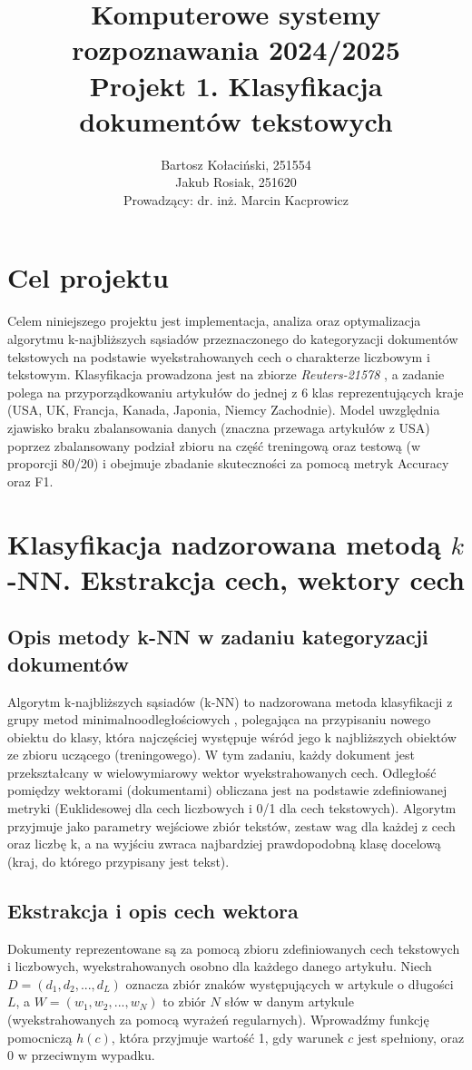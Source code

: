\documentclass{article}
\author{
	{Bartosz Kołaciński, 251554}\\
	{Jakub Rosiak, 251620}\\ 
	{Prowadzący: dr. inż. Marcin Kacprowicz}
}
\title{Komputerowe systemy rozpoznawania 2024/2025\\Projekt 1. Klasyfikacja dokumentów tekstowych}
\begin{document}
	\maketitle
	
	\section{Cel projektu}	
	Celem niniejszego projektu jest implementacja, analiza oraz optymalizacja algorytmu k-najbliższych sąsiadów  przeznaczonego do kategoryzacji dokumentów tekstowych na podstawie wyekstrahowanych cech o charakterze liczbowym i tekstowym.
	Klasyfikacja prowadzona jest na zbiorze \textit{Reuters-21578} \cite{reuters21578}, a zadanie polega na przyporządkowaniu artykułów do jednej z 6 klas reprezentujących kraje (USA, UK, Francja, Kanada, Japonia, Niemcy Zachodnie).
	Model uwzględnia zjawisko braku zbalansowania danych (znaczna przewaga artykułów z USA) poprzez zbalansowany podział zbioru na część treningową oraz testową (w proporcji 80/20) i obejmuje zbadanie skuteczności za pomocą metryk Accuracy oraz F1.
	
	\section{Klasyfikacja nadzorowana metodą $k$-NN.  Ekstrakcja cech, wektory cech}
	
	\subsection{Opis metody k-NN w zadaniu kategoryzacji dokumentów}
	Algorytm k-najbliższych sąsiadów (k-NN) to nadzorowana metoda klasyfikacji z grupy metod minimalnoodległościowych \cite{tadeusiewicz90}, polegająca na przypisaniu nowego obiektu do klasy, która najczęściej występuje wśród jego k najbliższych obiektów ze zbioru uczącego (treningowego). W tym zadaniu, każdy dokument jest przekształcany w wielowymiarowy wektor wyekstrahowanych cech.
	Odległość pomiędzy wektorami (dokumentami) obliczana jest na podstawie zdefiniowanej metryki (Euklidesowej dla cech liczbowych i 0/1 dla cech tekstowych). Algorytm przyjmuje jako parametry wejściowe zbiór tekstów, zestaw wag dla każdej z cech oraz liczbę k, a na wyjściu zwraca najbardziej prawdopodobną klasę docelową (kraj, do którego przypisany jest tekst).
	
	\subsection{Ekstrakcja i opis cech wektora}
	Dokumenty reprezentowane są za pomocą zbioru zdefiniowanych cech tekstowych i liczbowych, wyekstrahowanych osobno dla każdego danego artykułu. Niech \(D = (d_1, d_2, ..., d_L)\) oznacza zbiór znaków występujących w artykule o długości \(L\), a \(W = (w_1, w_2, ..., w_N)\) to zbiór \(N\) słów w danym artykule (wyekstrahowanych za pomocą wyrażeń regularnych). Wprowadźmy funkcję pomocniczą \(h(c)\), która przyjmuje wartość 1, gdy warunek \(c\) jest spełniony, oraz 0 w przeciwnym wypadku.
	
\end{document}
